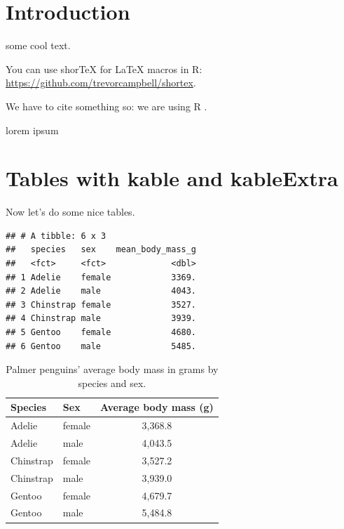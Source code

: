 \documentclass[
]{article}
\author{}
\date{\vspace{-2.5em}}
\begin{document}
\printtitle

\section{Introduction}

some cool text.

You can use shorTeX for LaTeX macros in R:
\url{https://github.com/trevorcampbell/shortex}.

We have to cite something so: we are using R \citep{R}.

\newpage

lorem ipsum

\hypertarget{tables-with-kable-and-kableextra}{%
\section{Tables with kable and
kableExtra}\label{tables-with-kable-and-kableextra}}

Now let's do some nice tables.

\begin{verbatim}
## # A tibble: 6 x 3
##   species   sex    mean_body_mass_g
##   <fct>     <fct>             <dbl>
## 1 Adelie    female            3369.
## 2 Adelie    male              4043.
## 3 Chinstrap female            3527.
## 4 Chinstrap male              3939.
## 5 Gentoo    female            4680.
## 6 Gentoo    male              5485.
\end{verbatim}

\begin{table}

\caption{\label{tab:table:kable}Palmer penguins' average body mass in grams by species and sex.}
\centering
\begin{tabular}[t]{llc}
\toprule
Species & Sex & Average body mass (g)\\
\midrule
Adelie & female & 3,368.8\\
Adelie & male & 4,043.5\\
Chinstrap & female & 3,527.2\\
Chinstrap & male & 3,939.0\\
Gentoo & female & 4,679.7\\
\addlinespace
Gentoo & male & 5,484.8\\
\bottomrule
\end{tabular}
\end{table}
\end{document}
